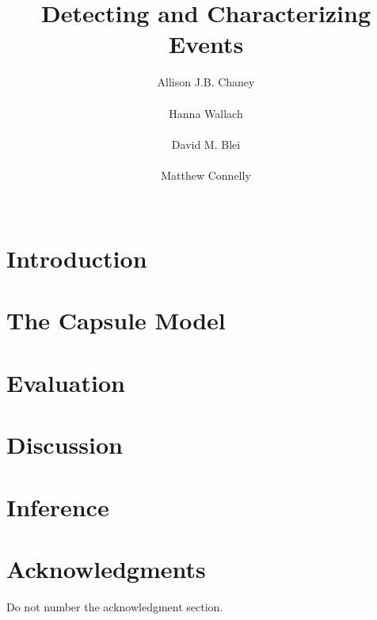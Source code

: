 \documentclass[11pt,letterpaper]{article}
\title{Detecting and Characterizing Events}
\author{
Allison J.B. Chaney\\
       \affaddr{Princeton University}\\
       \email{achaney@cs.princeton.edu}
\And
Hanna Wallach\\
       \affaddr{Microsoft Research}\\
       \email{wallach@microsoft.com}
\AND
David M. Blei\\
       \affaddr{Columbia University}\\
       \email{david.blei@columbia.edu}
\And
Matthew Connelly\\
       \affaddr{Columbia University}\\
       \email{mjc96@columbia.edu}
}
\date{}
\begin{document}
\maketitle

\begin{abstract}

\end{abstract}


\section{Introduction}
\label{sec:intro}


\section{The Capsule Model}
\label{sec:model}


\section{Evaluation}
\label{sec:eval}


\section{Discussion}
\label{sec:discussion}


\appendix
\section{Inference}




\section*{Acknowledgments}

Do not number the acknowledgment section. %



\end{document}
